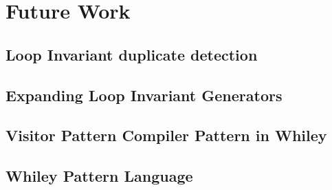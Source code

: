 \chapter{Future Work}\label{C:future}

\section{Loop Invariant duplicate detection}

\section{Expanding Loop Invariant Generators}

\section{Visitor Pattern Compiler Pattern in Whiley}

\section{Whiley Pattern Language}

